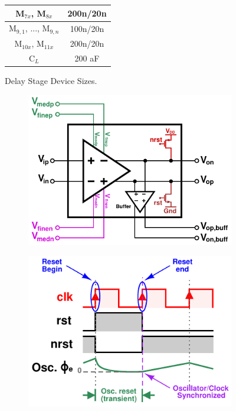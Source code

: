 \begin{figure}
\begin{floatrow}
{\begin{tabular}{|c|c|}
				\hline 
				\rule[-1ex]{0pt}{2.5ex} M$_{7x}$, M$_{8x}$ & 200n/20n\\ 
				\hline 
				\rule[-1ex]{0pt}{2.5ex} M$_{9,1}$, ..., M$_{9,n}$ & 100n/20n\\ 
				\hline 
				\rule[-1ex]{0pt}{2.5ex} M$_{10x}$, M$_{11x}$ & 200n/20n\\ 
				\hline 
				\rule[-1ex]{0pt}{2.5ex} C$_L$ & 200 aF\\ 
				\hline 
			\end{tabular} 
		}{%
			\caption{Delay Stage Device Sizes.}
			\label{tab:dly_dev_size}
		}
		\end{floatrow}
	\end{figure}




	\begin{figure}[htb!]
	    \centering
	    \begin{subfigure}{0.5\textwidth}
	        \centering
	        \includegraphics[width=1\textwidth, angle=0]{./figs/design/delay_cell_symbol_full2}
	        \caption{ }
	        \label{fig:delay_cell_symbol}
	    \end{subfigure}%
	    \begin{subfigure}{0.5\textwidth}
	        \centering
	        \includegraphics[width=1\textwidth, angle=0]{./figs/design/osc_reset}

\end{subfigure}
\end{figure}
